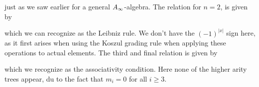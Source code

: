 just as we saw earlier for a general $A_{\infty}$-algebra. The relation for $n=2$, is given by


which we can recognize as the Leibniz rule. We don't have the $(-1)^{|x|}$ sign here, as it first arises when using the Koszul grading rule when applying these operations to actual elements. The third and final relation is given by 


which we recognize as the associativity condition. Here none of the higher arity trees appear, du to the fact that $m_i=0$ for all $i\geq 3$. 